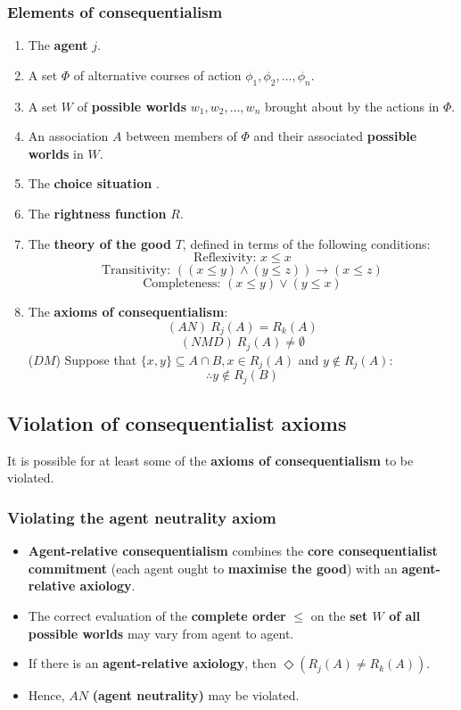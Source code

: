 \documentclass[11pt]{article}
\begin{document}
 \newpage
\subsubsection{Elements of consequentialism}
\label{sec:orgacfda7a}
\begin{enumerate}
\item The \textbf{agent} \(j\).
\item A set \(\Phi\) of alternative courses of action \(\phi_1, \phi_2, \ldots, \phi_n\).
\item A set \(W\) of \textbf{possible worlds} \(w_1, w_2, \ldots, w_n\) brought about by the actions in \(\Phi\).
\item An association \(A\) between members of \(\Phi\) and their associated \textbf{possible worlds} in \(W\).
\item The \textbf{choice situation} \(<j, A>\).
\item The \textbf{rightness function} \(R\).
\item The \textbf{theory of the good} \(T\), defined in terms of the following conditions:
\[\text{Reflexivity: } x \le x\]
\[\text{Transitivity: } ((x \le y) \wedge (y \le z)) \rightarrow (x \le z)\]
\[\text{Completeness: } (x \le y) \vee (y \le x)\]
\item The \textbf{axioms of consequentialism}:
\[(AN) \ R_j(A) = R_k (A)\]
\[(NMD) \ R_j(A) \ne \emptyset\]
(\(DM\)) Suppose that \(\{x, y\} \subseteq A \cap B, x \in R_j (A)\) and \(y \notin R_j (A)\):
\[\therefore y \notin R_j (B)\]
\end{enumerate}

 \newpage
\subsection{Violation of consequentialist axioms}
\label{sec:org6776727}
It is possible for at least some of the \textbf{axioms of consequentialism} to be violated.
\subsubsection{Violating the agent neutrality axiom}
\label{sec:org6db0f6b}
\begin{itemize}
\item \textbf{Agent-relative consequentialism} combines the \textbf{core consequentialist commitment} (each agent ought to \textbf{maximise the good}) with an \textbf{agent-relative axiology}.
\item The correct evaluation of the \textbf{complete order} \(\le\) on the \textbf{set \(W\) of all possible worlds} may vary from agent to agent.
\item If there is an \textbf{agent-relative axiology}, then \(\Diamond (R_j (A) \ne R_k (A))\).
\item Hence, \(AN\) \textbf{(agent neutrality)} may be violated.
\end{itemize}
\end{document}
